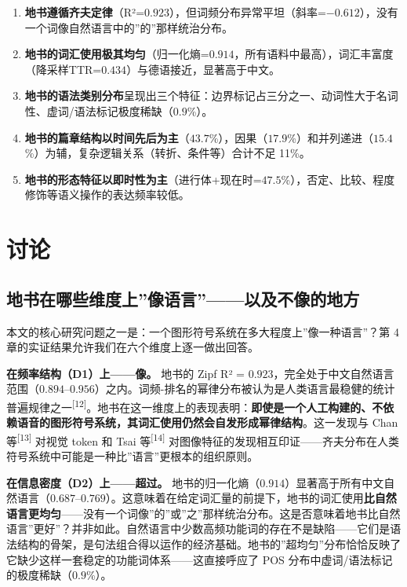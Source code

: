 \documentclass[12pt,a4paper,UTF8,fontset=founder]{ctexart}
\begin{document}
\begin{enumerate}
\def\labelenumi{\arabic{enumi}.}

\item
  \textbf{地书遵循齐夫定律}（R²=$0.923$），但词频分布异常平坦（斜率=$-0.612$），没有一个词像自然语言中的''的''那样统治分布。
\item
  \textbf{地书的词汇使用极其均匀}（归一化熵=$0.914$，所有语料中最高），词汇丰富度（降采样TTR=$0.434$）与德语接近，显著高于中文。
\item
  \textbf{地书的语法类别分布}呈现出三个特征：边界标记占三分之一、动词性大于名词性、虚词/语法标记极度稀缺（$0.9$\%）。
\item
  \textbf{地书的篇章结构以时间先后为主}（$43.7$\%），因果（$17.9$\%）和并列递进（$15.4$\%）为辅，复杂逻辑关系（转折、条件等）合计不足 11\%。
\item
  \textbf{地书的形态特征以即时性为主}（进行体+现在时=$47.5$\%），否定、比较、程度修饰等语义操作的表达频率较低。
\end{enumerate}

\newpage

\section{讨论}\label{ux8ba8ux8bba}

\subsection{地书在哪些维度上''像语言''------以及不像的地方}\label{ux5730ux4e66ux5728ux54eaux4e9bux7ef4ux5ea6ux4e0aux50cfux8bedux8a00ux4ee5ux53caux4e0dux50cfux7684ux5730ux65b9}

本文的核心研究问题之一是：一个图形符号系统在多大程度上''像一种语言''？第 4 章的实证结果允许我们在六个维度上逐一做出回答。

\textbf{在频率结构（D1）上------像。} 地书的 Zipf R² = $0.923$，完全处于中文自然语言范围（$0.894$--$0.956$）之内。词频-排名的幂律分布被认为是人类语言最稳健的统计普遍规律之一\textsuperscript{{[}12{]}}。地书在这一维度上的表现表明：\textbf{即使是一个人工构建的、不依赖语音的图形符号系统，其词汇使用仍然会自发形成幂律结构}。这一发现与 Chan 等\textsuperscript{{[}13{]}} 对视觉 token 和 Tsai 等\textsuperscript{{[}14{]}} 对图像特征的发现相互印证------齐夫分布在人类符号系统中可能是一种比''语言''更根本的组织原则。

\textbf{在信息密度（D2）上------超过。} 地书的归一化熵（$0.914$）显著高于所有中文自然语言（$0.687$--$0.769$）。这意味着在给定词汇量的前提下，地书的词汇使用\textbf{比自然语言更均匀}------没有一个词像''的''或''之''那样统治分布。这是否意味着地书比自然语言''更好''？并非如此。自然语言中少数高频功能词的存在不是缺陷------它们是语法结构的骨架，是句法组合得以运作的经济基础。地书的''超均匀''分布恰恰反映了它缺少这样一套稳定的功能词体系------这直接呼应了 POS 分布中虚词/语法标记的极度稀缺（$0.9$\%）。
\end{document}
